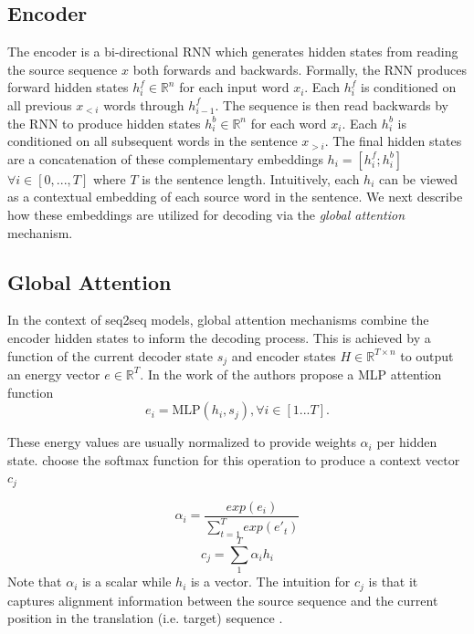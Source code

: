 \subsection{Encoder}
The encoder is a bi-directional \ac{RNN} which generates hidden states from reading the source sequence $x$ both forwards and backwards. Formally, the \ac{RNN} produces forward hidden states $h^{f}_{i} \in \mathbb{R}^{n}$ for each input word $x_{i}$. Each $h^{f}_{i}$ is conditioned on all previous $x_{<i}$ words through $h_{i-1}^{f}$. The sequence is then read backwards by the \ac{RNN} to produce hidden states $h^{b}_{i} \in \mathbb{R}^{n}$ for each word $x_{i}$. Each $h^{b}_{i}$ is conditioned on all subsequent words in the sentence $x_{>i}$. The final hidden states are a concatenation of these complementary embeddings $h_{i}  = [h^{f}_{i} ; h^{b}_{i}]$ $ \forall i \in [0,...,T]$ where $T$ is the sentence length. Intuitively, each $h_{i}$ can be viewed as a contextual embedding of each source word in the sentence. We next describe how these embeddings are utilized for decoding via the \textit{global attention} mechanism. %

\subsection{Global Attention}

In the context of \ac{seq2seq} models, global attention mechanisms combine the encoder hidden states to inform the decoding process. This is achieved by a function of the current decoder state $s_{j}$ and encoder states $H \in \mathbb{R}^{T \times n}$ to output an energy vector $e \in \mathbb{R}^{T}$. In the work of \citet{bahdanau2014NMTBYJoint} the authors propose a \ac{MLP} attention function
\begin{equation}
e_{i} = \text{MLP}(h_{i}, s_{j}), \forall i \in [1...T].
\end{equation}

These energy values are usually normalized to provide weights $\alpha_{i}$ per hidden state. \citet{bahdanau2014NMTBYJoint} choose the softmax function for this operation to produce a context vector $c_{j}$

\begin{equation}
	\alpha_{i} = \frac{exp(e_{i})}{\sum_{t=1}^{T} exp(e'_{t})}
\end{equation}
\begin{equation}
c_{j} = \sum_{1}^{T} \alpha_{i}  h_{i}
\end{equation}
Note that $\alpha_{i}$ is  a scalar while $h_{i}$ is a vector. The intuition for $c_{j}$ is that it captures alignment information between the source sequence and the current position in the translation (i.e. target) sequence \cite{bahdanau2014NMTBYJoint}. %

